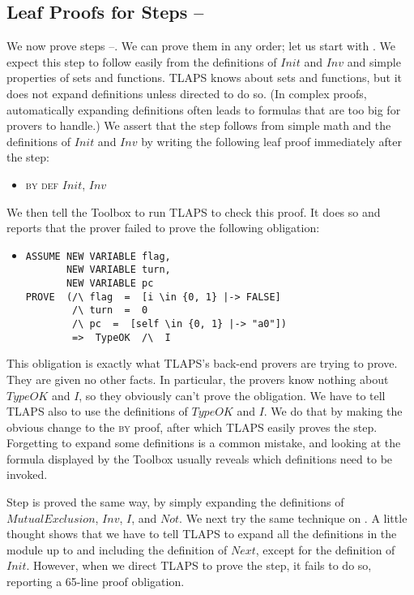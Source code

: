 \documentclass[a4paper]{llncs}
\makeatletter
\newcommand{\step}[2]{{\tlatex \@pfstepnum{#1}{#2}}}
\newenvironment{display}{\begin{itemize}\item[]}{\end{itemize}}
\makeatother
\begin{document}
\subsection{Leaf Proofs for Steps \step{1}{1}--\step{1}{3}}
\label{sec:leaf-proofs}

We now prove steps \step{1}{1}--\step{1}{3}.  We can prove them in any
order; let us start with \step{1}{1}.  We expect this step to follow
easily from the definitions of $Init$ and $Inv$ and simple properties
of sets and functions.  TLAPS knows about sets and functions, but it
does not expand definitions unless directed to do so.  (In complex
proofs, automatically expanding definitions often leads to formulas
that are too big for provers to handle.)  We assert that the
step follows from simple math and the definitions of $Init$ and $Inv$
by writing the following leaf proof immediately after the step:
\begin{display}
\textsc{by def} $Init$, $Inv$
\end{display}
We then tell the Toolbox to run TLAPS to check this proof.  It does so
and reports that the prover failed to prove the following obligation:
\begin{display}
\small
\begin{verbatim}
ASSUME NEW VARIABLE flag,
       NEW VARIABLE turn,
       NEW VARIABLE pc
PROVE  (/\ flag  =  [i \in {0, 1} |-> FALSE]
        /\ turn  =  0
        /\ pc  =  [self \in {0, 1} |-> "a0"])
        =>  TypeOK  /\  I
\end{verbatim}
\end{display}
This obligation is exactly what TLAPS's back-end provers are trying to
prove.  They are given no other facts.  In particular, the
provers know nothing about $TypeOK$ and $I$, so they obviously can't
prove the obligation.  We have to tell TLAPS also to use the definitions
of $TypeOK$ and $I$.  We do that by making the obvious change to the
\textsc{by} proof, after which TLAPS easily proves the step.
Forgetting to expand some definitions is a common mistake, and looking at the
formula displayed by the Toolbox usually reveals which definitions need to be
invoked.

Step \step{1}{3} is proved the same way, by simply expanding the
definitions of $MutualExclusion$, $Inv$, $I$, and $Not$.  We
next try the same technique on \step{1}{2}.  A little thought shows
that we have to tell TLAPS to expand all the definitions in the module
up to and including the definition of $Next$, except for the
definition of $Init$.
However,
when we direct TLAPS to prove the step, it fails to do so, reporting a
65-line proof obligation. 
\end{document}
